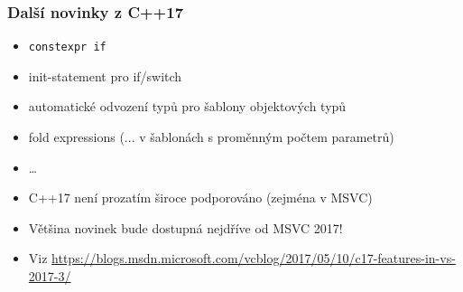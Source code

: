 \begin{frame}[fragile]
\frametitle{Další novinky z C++17}
\begin{bonusblock}{}
\begin{itemize}
\item \lstinline|constexpr if|
\item init-statement pro if/switch
\item automatické odvození typů pro šablony objektových typů
\item fold expressions (... v šablonách s proměnným počtem parametrů)
\item \ldots
\end{itemize}
\end{bonusblock}

\begin{noblock}
\begin{itemize}
\item C++17 není prozatím široce podporováno (zejména v MSVC)
\item Většina novinek bude dostupná nejdříve od MSVC 2017!
\item Viz \url{https://blogs.msdn.microsoft.com/vcblog/2017/05/10/c17-features-in-vs-2017-3/}
\end{itemize}
\end{noblock}
\end{frame}




\zkouskove